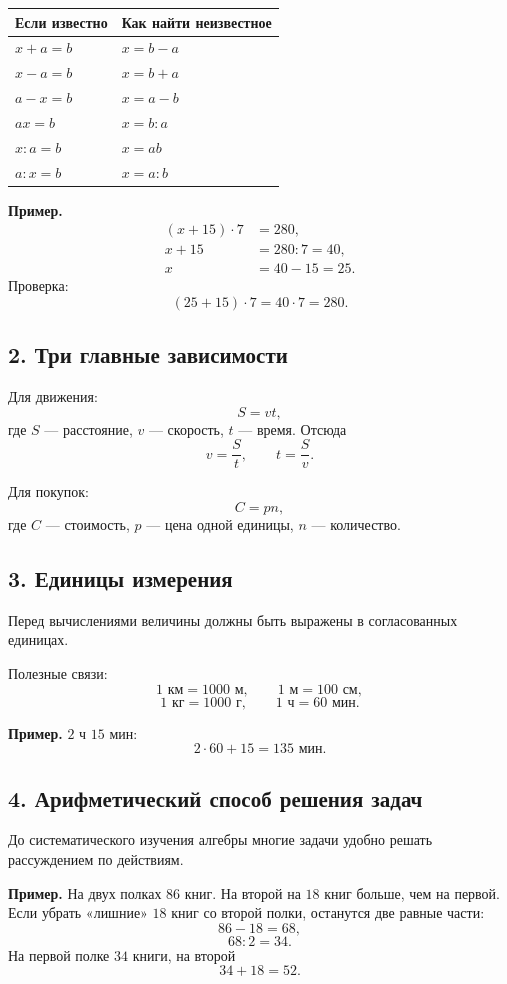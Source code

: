 \documentclass[12pt,a4paper]{article}
\begin{document}
\begin{center}
\begin{tabularx}{\textwidth}{@{}X X@{}}
\toprule
Если известно & Как найти неизвестное \\
\midrule
$x+a=b$ & $x=b-a$ \\
$x-a=b$ & $x=b+a$ \\
$a-x=b$ & $x=a-b$ \\
$ax=b$ & $x=b:a$ \\
$x:a=b$ & $x=ab$ \\
$a:x=b$ & $x=a:b$ \\
\bottomrule
\end{tabularx}
\end{center}

\textbf{Пример.}
\begin{align*}
(x+15)\cdot7&=280,\\
x+15&=280:7=40,\\
x&=40-15=25.
\end{align*}
Проверка:
\[
(25+15)\cdot7=40\cdot7=280.
\]

\subsection*{2. Три главные зависимости}
Для движения:
\[
S=vt,
\]
где $S$ --- расстояние, $v$ --- скорость, $t$ --- время. Отсюда
\[
v=\frac St,\qquad t=\frac Sv.
\]

Для покупок:
\[
C=pn,
\]
где $C$ --- стоимость, $p$ --- цена одной единицы, $n$ --- количество.

\subsection*{3. Единицы измерения}
Перед вычислениями величины должны быть выражены в согласованных единицах.

Полезные связи:
\[
1\text{ км}=1000\text{ м},\qquad 1\text{ м}=100\text{ см},
\]
\[
1\text{ кг}=1000\text{ г},\qquad 1\text{ ч}=60\text{ мин}.
\]

\textbf{Пример.} $2$ ч $15$ мин:
\[
2\cdot60+15=135\text{ мин}.
\]

\subsection*{4. Арифметический способ решения задач}
До систематического изучения алгебры многие задачи удобно решать рассуждением по действиям.

\textbf{Пример.} На двух полках $86$ книг. На второй на $18$ книг больше, чем на первой. Если убрать «лишние» $18$ книг со второй полки, останутся две равные части:
\[
86-18=68,
\]
\[
68:2=34.
\]
На первой полке $34$ книги, на второй
\[
34+18=52.
\]
\end{document}
